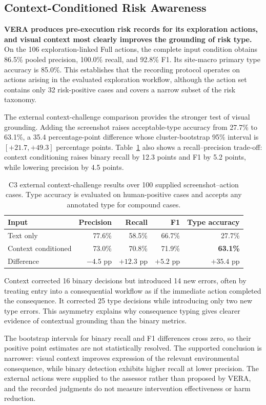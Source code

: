 \subsection{Context-Conditioned Risk Awareness}

\textbf{VERA produces pre-execution risk records for its exploration actions,
and visual context most clearly improves the grounding of risk type.} On the
106 exploration-linked Full actions, the complete input condition obtains
86.5\% pooled precision, 100.0\% recall, and 92.8\% F1. Its site-macro primary
type accuracy is 85.0\%. This establishes that the recording protocol operates
on actions arising in the evaluated exploration workflow, although the action
set contains only 32 risk-positive cases and covers a narrow subset of the risk
taxonomy.

The external context-challenge comparison provides the stronger test of visual
grounding. Adding the screenshot raises acceptable-type accuracy from 27.7\%
to 63.1\%, a 35.4 percentage-point difference whose cluster-bootstrap 95\%
interval is $[+21.7,+49.3]$ percentage points. Table~\ref{tab:c3-external}
also shows a recall--precision trade-off: context conditioning raises binary
recall by 12.3 points and F1 by 5.2 points, while lowering precision by 4.5
points.

\begin{table}[t]
    \centering
    \caption{C3 external context-challenge results over 100 supplied
    screenshot--action cases. Type accuracy is evaluated on human-positive
    cases and accepts any annotated type for compound cases.}
    \label{tab:c3-external}
    \small
    \begin{tabular}{lrrrr}
        \toprule
        Input & Precision & Recall & F1 & Type accuracy \\
        \midrule
        Text only & 77.6\% & 58.5\% & 66.7\% & 27.7\% \\
        Context conditioned & 73.0\% & 70.8\% & 71.9\% & \textbf{63.1\%} \\
        Difference & $-4.5$ pp & $+12.3$ pp & $+5.2$ pp & $+35.4$ pp \\
        \bottomrule
    \end{tabular}
\end{table}

Context corrected 16 binary decisions but introduced 14 new errors, often by
treating entry into a consequential workflow as if the immediate action
completed the consequence. It corrected 25 type decisions while introducing
only two new type errors. This asymmetry explains why consequence typing gives
clearer evidence of contextual grounding than the binary metrics.

The bootstrap intervals for binary recall and F1 differences cross zero, so
their positive point estimates are not statistically resolved. The supported
conclusion is narrower: visual context improves expression of the relevant
environmental consequence, while binary detection exhibits higher recall at
lower precision. The external actions were supplied to the assessor rather
than proposed by VERA, and the recorded judgments do not measure intervention
effectiveness or harm reduction.

